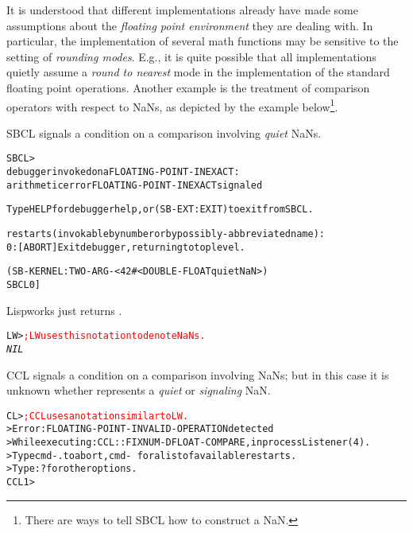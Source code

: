 \documentclass[../Introduction.tex]{subfiles}
\begin{document}
It is understood that different \CL{} implementations already have
made some assumptions about the \emph{floating point environment} they
are dealing with.  In particular, the implementation of several \CL{}
math functions may be sensitive to the
setting of \emph{rounding modes}.  E.g., it is quite possible that all
\CL{} implementations quietly assume a \emph{round to nearest} mode in
the implementation of the \CL{} standard floating point operations.
Another example is the treatment of comparison operators with respect
to NaNs, as depicted by the example below\footnote{There are ways to
  tell SBCL how to construct a NaN.}.

\vspace*{3mm}

\noindent
SBCL signals a  condition on a
comparison involving \emph{quiet} NaNs.
\begin{alltt}
SBCL> 
debugger invoked on a FLOATING-POINT-INEXACT:
  arithmetic error FLOATING-POINT-INEXACT signaled

Type HELP for debugger help, or (SB-EXT:EXIT) to exit from SBCL.

restarts (invokable by number or by possibly-abbreviated name):
  0: [ABORT] Exit debugger, returning to top level.

(SB-KERNEL:TWO-ARG-< 42 #<DOUBLE-FLOAT quiet NaN>)
SBCL 0]
\end{alltt}

\vspace*{3mm}

\noindent
Lispworks just returns .
\begin{alltt}
LW>  \textcolor{red}{; LW uses this notation to denote NaNs.}
\textit{NIL}
\end{alltt}

\vspace*{3mm}

\noindent
CCL signals a  condition on a
comparison involving NaNs; but in this case it is unknown whether
 represents a \emph{quiet} or \emph{signaling} NaN.
\begin{alltt}
CL>  \textcolor{red}{; CCL uses a notation similar to LW.}
> Error: FLOATING-POINT-INVALID-OPERATION detected
> While executing: CCL::FIXNUM-DFLOAT-COMPARE, in process Listener(4).
> Type cmd-. to abort, cmd-\ for a list of available restarts.
> Type :? for other options.
CCL 1 > 
\end{alltt}
\end{document}
